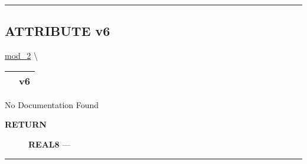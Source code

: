 \rule{\linewidth}{0.5pt}
\subsection*{\textsf{\colorbox{headtoc}{\color{white} ATTRIBUTE}
v6}}

\hypertarget{ecldoc:mod_2.v6}{}
\hspace{0pt} \hyperlink{ecldoc:mod_2}{mod_2} \textbackslash 

{\renewcommand{\arraystretch}{1.5}
\begin{tabularx}{\textwidth}{|>{\raggedright\arraybackslash}l|X|}
\hline
\hspace{0pt}\mytexttt{\color{red} } & \textbf{v6} \\
\hline
\end{tabularx}
}

\par





No Documentation Found








\par
\begin{description}
\item [\colorbox{tagtype}{\color{white} \textbf{\textsf{RETURN}}}] \textbf{REAL8} --- 
\end{description}




\rule{\linewidth}{0.5pt}


